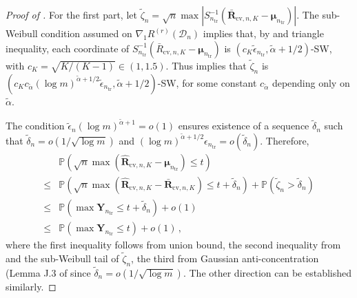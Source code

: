 \documentclass[11pt]{article}
\theoremstyle{plain}
\newcommand{\cv}{{\mathrm{cv}}}
\newcommand{\tr}{{\mathrm{tr}}}
\newcommand{\D}{{\mathcal{D}}}
\begin{document}
\begin{proof}[Proof of ]
For the first part, let $\tilde\zeta_n = \sqrt{n}\max|S_{n_\tr}^{-1}(\bar{\mathbf R}_{\cv,n,K}-\boldsymbol{\mu}_{n_\tr})|$.   The sub-Weibull condition assumed on $\nabla_1 R^{(r)}(\D_n)$ implies that, by  and triangle inequality,  each coordinate of $S_{n_\tr}^{-1}(\bar R_{\cv,n,K}-\boldsymbol{\mu}_{n_\tr})$ is $(c_K\tilde\epsilon_{n_\tr},\tilde\alpha+1/2)$-SW, with $c_K=\sqrt{K/(K-1)}\in(1,1.5)$.
Thus  implies that $\tilde\zeta_n$ is $(c_Kc_{\tilde\alpha}(\log m)^{\tilde\alpha+1/2}\tilde\epsilon_{n_\tr},\tilde\alpha+1/2)$-SW, for some constant $c_{\tilde\alpha}$ depending only on $\tilde\alpha$.  

The condition $\tilde\epsilon_n(\log m)^{\tilde\alpha+1}=o(1)$ ensures existence of a sequence $\tilde\delta_n$ such that $\tilde\delta_n=o(1/\sqrt{\log m})$ and 
$(\log m)^{\tilde\alpha+1/2}\epsilon_{n_\tr}=o(\tilde\delta_n)$. Therefore,
\begin{align*}
&\mathbb P\left(\sqrt{n}\max(\hat{\mathbf R}_{\cv,n,K}-\boldsymbol{\mu}_{n_\tr})\le t\right)\\
\le & \mathbb P\left(\sqrt{n}\max(\hat{\mathbf R}_{\cv,n,K}-\bar{\mathbf R}_{\cv,n,K})\le t+\tilde\delta_n\right)+\mathbb P(\tilde\zeta_n>\tilde\delta_n)\\
\le & \mathbb P(\max \mathbf Y_{n_\tr}\le t+\tilde\delta_n)+o(1)\\
\le & \mathbb P(\max \mathbf Y_{n_\tr}\le t)+o(1)\,,
\end{align*}
where the first inequality follows from union bound, the second inequality from  and the sub-Weibull tail of $\tilde\zeta_n$, the third from Gaussian anti-concentration (Lemma J.3 of \cite{chernozhukov2022improved} since $\tilde\delta_n=o(1/\sqrt{\log m})$.
The other direction can be established similarly.
\end{proof}
\end{document}
